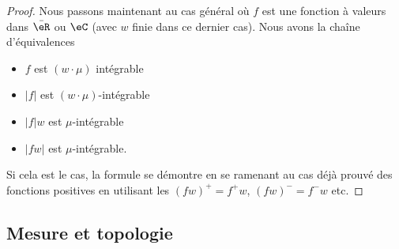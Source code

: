 \begin{proof}
    Nous passons maintenant au cas général où \( f\) est une fonction à valeurs dans \( \bar\eR\) ou \( \eC\) (avec \( w\) finie dans ce dernier cas). Nous avons la chaîne d'équivalences
    \begin{itemize}
            \renewcommand{\labelitemi}{$\Leftrightarrow$}
        \item \( f\) est \( (w\cdot\mu)\) intégrable
        \item \( | f |\) est \( (w\cdot\mu)\)-intégrable
        \item \( | f |w\) est \( \mu\)-intégrable
        \item \( | fw |\) est \( \mu\)-intégrable.
    \end{itemize}

    Si cela est le cas, la formule se démontre en se ramenant au cas déjà prouvé des fonctions positives en utilisant les \( (fw)^+=f^+w\), \( (fw)^-=f^-w\) etc.
\end{proof}

\subsection{Mesure et topologie}

